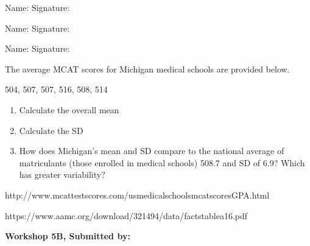\documentclass[11pt]{book}\usepackage[]{graphicx}\usepackage[]{color}
\begin{document}
\begin{exercises}
\begin{exercise}
\begin{center}
{{\vspace{4mm}
Name: \underline{\phantom{xxxxxxxxxxxxxxxxxxxxxxxx}} Signature: \underline{\phantom{xxxxxxxxxxxxxxxxxxxxxxxx}}

\vspace{4mm}
Name: \underline{\phantom{xxxxxxxxxxxxxxxxxxxxxxxx}} Signature: \underline{\phantom{xxxxxxxxxxxxxxxxxxxxxxxx}}

\vspace{4mm}
Name: \underline{\phantom{xxxxxxxxxxxxxxxxxxxxxxxx}} Signature: \underline{\phantom{xxxxxxxxxxxxxxxxxxxxxxxx}}
 }}
\end{center}

The average MCAT scores for Michigan medical schools are provided below.

504, 507, 507, 516, 508, 514

\begin{enumerate}
  \item Calculate the overall mean
  \item Calculate the SD
  \item How does Michigan's mean and SD compare to the national average of matriculants (those enrolled in medical schools) 508.7 and SD of 6.9?  Which has greater variability?
\end{enumerate}

http://www.mcattestscores.com/usmedicalschoolsmcatscoresGPA.html

https://www.aamc.org/download/321494/data/factstablea16.pdf

\end{exercise}
\begin{solution}  %

\end{solution}

\clearpage

    \begin{exercise}  %

    \begin{center}
\begin{flushleft}\textbf{\large \hfill Workshop 5B, Submitted by: }\end{flushleft}

\end{center}
\end{exercise}
\end{exercises}
\end{document}
